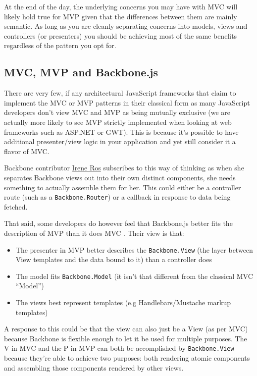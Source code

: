 \documentclass[9pt]{book}
\begin{document}
At the end of the day, the underlying concerns you may have with MVC
will likely hold true for MVP given that the differences between them
are mainly semantic. As long as you are cleanly separating concerns into
models, views and controllers (or presenters) you should be achieving
most of the same benefits regardless of the pattern you opt for.

\subsection{MVC, MVP and Backbone.js}\label{mvc-mvp-and-backbone.js}

There are very few, if any architectural JavaScript frameworks that
claim to implement the MVC or MVP patterns in their classical form as
many JavaScript developers don't view MVC and MVP as being mutually
exclusive (we are actually more likely to see MVP strictly implemented
when looking at web frameworks such as ASP.NET or GWT). This is because
it's possible to have additional presenter/view logic in your
application and yet still consider it a flavor of MVC.

Backbone contributor \href{http://ireneros.com/}{Irene Ros} subscribes
to this way of thinking as when she separates Backbone views out into
their own distinct components, she needs something to actually assemble
them for her. This could either be a controller route (such as a
\texttt{Backbone.Router}) or a callback in response to data being
fetched.

That said, some developers do however feel that Backbone.js better fits
the description of MVP than it does MVC . Their view is that:

\begin{itemize}
\itemsep1pt\parskip0pt
\item
  The presenter in MVP better describes the \texttt{Backbone.View} (the
  layer between View templates and the data bound to it) than a
  controller does
\item
  The model fits \texttt{Backbone.Model} (it isn't that different from
  the classical MVC ``Model'')
\item
  The views best represent templates (e.g Handlebars/Mustache markup
  templates)
\end{itemize}

A response to this could be that the view can also just be a View (as
per MVC) because Backbone is flexible enough to let it be used for
multiple purposes. The V in MVC and the P in MVP can both be
accomplished by \texttt{Backbone.View} because they're able to achieve
two purposes: both rendering atomic components and assembling those
components rendered by other views.
\end{document}
